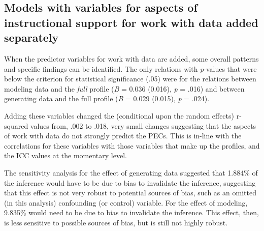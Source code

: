 \documentclass[]{book}
\theoremstyle{definition}
\theoremstyle{definition}
\theoremstyle{definition}
\theoremstyle{remark}
\begin{document}
\subsection{Models with variables for aspects of instructional support
for work with data added
separately}\label{models-with-variables-for-aspects-of-instructional-support-for-work-with-data-added-separately}

When the predictor variables for work with data are added, some overall
patterns and specific findings can be identified. The only relations
with \emph{p}-values that were below the criterion for statistical
significance (.05) were for the relations between modeling data and the
\emph{full} profile (\emph{B} = 0.036 (0.016), \emph{p} = .016) and
between generating data and the full profile (\emph{B} = 0.029 (0.015),
\emph{p} = .024).

Adding these variables changed the (conditional upon the random effects)
r-squared values from, .002 to .018, very small changes suggesting that
the aspects of work with data do not strongly predict the PECs. This is
in-line with the correlations for these variables with those variables
that make up the profiles, and the ICC values at the momentary level.

The sensitivity analysis for the effect of generating data suggested
that 1.884\% of the inference would have to be due to bias to invalidate
the inference, suggesting that this effect is not very robust to
potential sources of bias, such as an omitted (in this analysis)
confounding (or control) variable. For the effect of modeling, 9.835\%
would need to be due to bias to invalidate the inference. This effect,
then, is less sensitive to possible sources of bias, but is still not
highly robust.
\end{document}
